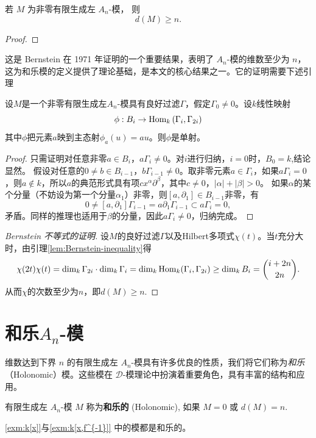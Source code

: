 \documentclass[12pt,a4paper]{ctexrep}   %
\begin{document}
\begin{theorem}
    若 $M$ 为非零有限生成左 $A_n$-模，
    则
    \[
        d(M)\ge n.
    \]
    \begin{proof}

    \end{proof}
\end{theorem}
这是 Bernstein 在 1971 年证明的一个重要结果，表明了 $A_n$-模的维数至少为 $n$，这为和乐模的定义提供了理论基础，是本文的核心结果之一。它的证明需要下述引理
\begin{lemma}
    \label{lem:Bernstein-inequality}
    设$M$是一个非零有限生成左$A_n$-模具有良好过滤$\Gamma$，假定$\Gamma_0\neq 0$。设$k$线性映射
    \begin{equation*}
        \phi:B_i \to \operatorname{Hom}_{k}\left( \Gamma_i,\Gamma_{2i} \right)
    \end{equation*}
    其中$\phi$把元素$a$映到主态射$\phi_a(u)=au$。则$\phi$是单射。
    \begin{proof}
        只需证明对任意非零$a\in B_i$，$a\Gamma_i\neq 0$。对$i$进行归纳，$i=0$时，$B_0=k$,结论显然。
        假设对任意的$0\neq b\in B_{i-1}$，$b\Gamma_{i-1}\neq 0$。取非零元素$a\in \Gamma_i$，如果$a\Gamma_i=0$，则$a\notin k$，所以$a$的典范形式具有项$cx^\alpha\partial^\beta$，其中$c\neq 0$，$\left|\alpha\right|+\left|\beta\right|>0$。
        如果$\alpha$的某个分量（不妨设为第一个分量$\alpha_1$）非零，则$[a,\partial_1]\in B_{i-1}$非零，有
        \begin{equation*}
            0\neq [a,\partial_1]\Gamma_{i-1}=a\partial_1\Gamma_{i-1}\subset a\Gamma_i=0,
        \end{equation*}
        矛盾。同样的推理也适用于$\beta$的分量，因此$a\Gamma_i\neq 0$，归纳完成。
    \end{proof}
\end{lemma}
\begin{proof}
    [Bernstein 不等式的证明]设$M$的良好过滤$\Gamma$以及Hilbert多项式$\chi(t)$。当$t$充分大时，由引理\ref{lem:Bernstein-inequality}得
    \begin{equation*}
        \chi(2t)\chi(t)
        =
        \dim_k \Gamma_{2i} \cdot \dim_k \Gamma_i
        = \dim_k \operatorname{Hom}_k(\Gamma_i,\Gamma_{2i})
        \geq \dim_k B_i
        = \binom{i+2n}{2n}.
    \end{equation*}
    从而$\chi$的次数至少为$n$，即$d(M)\geq n$.
\end{proof}


\section{和乐$A_n$-模}
维数达到下界 $n$ 的有限生成左 $A_n$-模具有许多优良的性质，我们将它们称为\emph{和乐}（Holonomic）模。这些模在 $\mathcal{D}$-模理论中扮演着重要角色，具有丰富的结构和应用。
\begin{definition}
    有限生成左 $A_n$-模 $M$
    称为\textbf{和乐的} (Holonomic),
    如果 $M=0$ 或 $d(M)=n$.
\end{definition}
\begin{example}
    \ref{exm:k[x]}与\ref{exm:k[x,f^{-1}]} 中的模都是和乐的。
\end{example}
\end{document}
